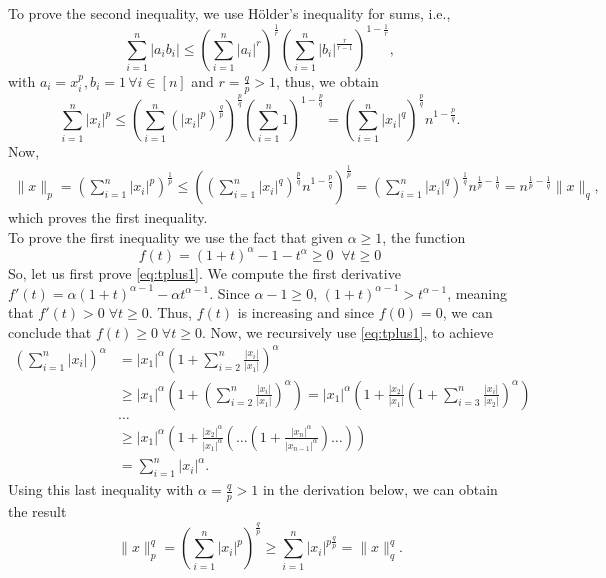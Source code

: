 \documentclass{ExerciseSheet}
\newif\ifsolutions
\begin{document}
\ifsolutions
\vskip 0.3cm
\begin{solution}
To prove the second inequality, we use H\"older's inequality for sums, i.e., 
	\begin{equation*}
		\sum_{i=1}^{n}|a_i b_i| \leq \left(\sum_{i=1}^{n} |a_i|^r \right)^{\frac{1}{r}} \left(\sum_{i=1}^{n} |b_i|^{\frac{r}{r-1}} \right)^{1-\frac{1}{r}},
	\end{equation*}
	with $a_i = x_i^p, b_i=1 \, \forall i \in [n]$ and $r=\frac{q}{p}>1$, thus, we obtain
	\begin{equation*}
		\sum_{i=1}^{n}|x_i|^p \leq \left(\sum_{i=1}^{n} (|x_i|^p)^{\frac{q}{p}} \right)^{\frac{p}{q}} \left(\sum_{i=1}^{n} 1 \right)^{1-\frac{p}{q}} = \left(\sum_{i=1}^{n} |x_i|^q\right)^{\frac{p}{q}} n^{1-\frac{p}{q}}.
	\end{equation*}
	Now, 
	\begin{eqnarray*}
		\| x \|_p = \left(\sum_{i=1}^{n} |x_i|^p \right)^{\frac{1}{p}} \leq \left(\left(\sum_{i=1}^{n} |x_i|^q\right)^{\frac{p}{q}} n^{1-\frac{p}{q}} \right)^{\frac{1}{p}} = \left(\sum_{i=1}^{n} |x_i|^q\right)^{\frac{1}{q}} n^{\frac{1}{p}-\frac{1}{q}} = n^{\frac{1}{p}-\frac{1}{q}} \| x\|_q,
	\end{eqnarray*}
	which proves the first inequality.\\
	To prove the first inequality we use the fact that given $\alpha\geq1$, the function 
	\begin{equation}\label{eq:tplus1}
		f(t)= (1+t)^\alpha - 1 -t^\alpha\geq0 \; \;\forall t\geq 0
	\end{equation}
	So, let us first prove \eqref{eq:tplus1}. We compute the first derivative $f'(t)=\alpha(1+t)^{\alpha-1}-\alpha t^{\alpha-1}$. Since $\alpha-1\geq0$, $(1+t)^{\alpha-1}>t^{\alpha-1}$, meaning that $f'(t)>0 \; \forall t\geq0$. Thus, $f(t)$ is increasing and since $f(0)=0$, we can conclude that $f(t)\geq0 \;\forall t\geq 0.$ Now, we recursively use \eqref{eq:tplus1}, to achieve
	\begin{align*}
		\left(\sum_{i=1}^{n} |x_i| \right)^\alpha &= |x_1|^\alpha \left(1+\sum_{i=2}^{n} \frac{|x_i|}{|x_1|} \right)^\alpha\\
		&\geq |x_1|^\alpha \left(1+ \left(\sum_{i=2}^{n} \frac{|x_i|}{|x_1|}\right)^\alpha\right) = |x_1|^\alpha \left(1+\frac{|x_2|}{|x_1|} \left(1 + \sum_{i=3}^{n} \frac{|x_i|}{|x_2|}\right)^\alpha\right)  \\
		&\dots\\
		& \geq |x_1|^\alpha\left(1+ \frac{|x_2|^\alpha}{|x_1|^\alpha}\left(\dots \left( 1+ \frac{|x_n|^\alpha}{|x_{n-1}|^\alpha}\right)\dots\right)\right)\\
		& = \sum_{i=1}^{n}|x_i|^\alpha.
	\end{align*}
	Using this last inequality with $\alpha=\frac{q}{p}> 1$ in the derivation below, we can obtain the result
	\begin{equation*}
		\| x\|_p^q = \left(\sum_{i=1}^{n} |x_i|^p \right)^{\frac{q}{p}} \geq \sum_{i=1}^{n} |x_i|^{p\frac{q}{p}} = \| x\|_q^q.
	\end{equation*}
\end{solution}
\end{document}
